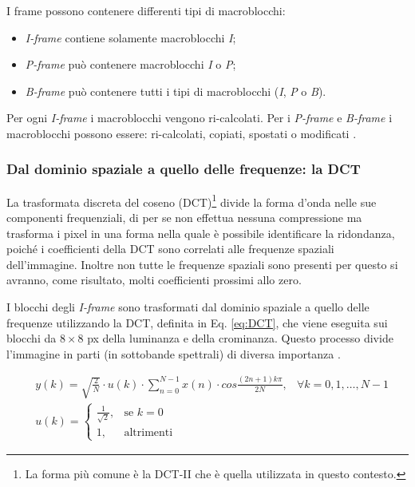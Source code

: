 I frame possono contenere differenti tipi di macroblocchi:

\begin{itemize}
	\item \textit{I-frame} contiene solamente macroblocchi \textit{I};
	\item \textit{P-frame} può contenere macroblocchi \textit{I} o \textit{P};
	\item \textit{B-frame} può contenere tutti i tipi di macroblocchi (\textit{I}, \textit{P} o \textit{B}).
\end{itemize}

Per ogni \textit{I-frame} i macroblocchi vengono ri-calcolati. Per i \textit{P-frame} e \textit{B-frame} i macroblocchi possono essere: ri-calcolati, copiati, spostati o modificati \parencite{MPEG_1_Video}.



\subsubsection{Dal dominio spaziale a quello delle frequenze: la DCT}
La trasformata discreta del coseno (DCT)\footnote{La forma più comune è la DCT-II che è quella utilizzata in questo contesto.} divide la forma d'onda nelle sue componenti frequenziali, di per se non effettua nessuna compressione ma trasforma i pixel in una forma nella quale è possibile identificare la ridondanza, poiché i coefficienti della DCT sono correlati alle frequenze spaziali dell'immagine. Inoltre non tutte le frequenze spaziali sono presenti per questo si avranno, come risultato, molti coefficienti prossimi allo zero.

I blocchi degli \textit{I-frame} sono trasformati dal dominio spaziale a quello delle frequenze utilizzando la DCT, definita in Eq. \ref{eq:DCT}, che viene eseguita sui blocchi da $8\times8$ px della luminanza e della crominanza. Questo processo divide l'immagine in parti (in sottobande spettrali) di diversa importanza \parencite{HyesookLim2000Asaf}.

\begin{equation} \label{eq:DCT}
	\begin{aligned}
		& y(k) = \sqrt{\frac{2}{N}} \cdot u(k) \cdot \sum_{n=0}^{N-1} x(n) \cdot cos \frac{(2n+1)k\pi}{2N}, & \forall k = 0, 1, \dots, N-1\\
		& u(k) =
		\begin{cases}
			\frac{1}{\sqrt{2}},	& \text{se } k=0\\
			1,					& \text{altrimenti}
		\end{cases}
	\end{aligned}
\end{equation}

